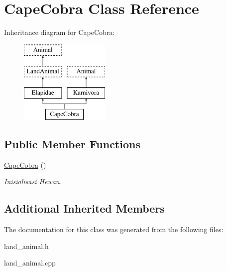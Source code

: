 \hypertarget{class_cape_cobra}{}\section{Cape\+Cobra Class Reference}
\label{class_cape_cobra}
Inheritance diagram for Cape\+Cobra\+:\begin{figure}[H]
\begin{center}
\leavevmode
\includegraphics[height=4.000000cm]{class_cape_cobra}
\end{center}
\end{figure}
\subsection*{Public Member Functions}
\begin{DoxyCompactItemize}
\item 
\hyperlink{class_cape_cobra_aa61f18faa72f114ac41641836bf07db7}{Cape\+Cobra} ()\hypertarget{class_cape_cobra_aa61f18faa72f114ac41641836bf07db7}{}\label{class_cape_cobra_aa61f18faa72f114ac41641836bf07db7}

\begin{DoxyCompactList}\small\item\em Inisialisasi Hewan. \end{DoxyCompactList}\end{DoxyCompactItemize}
\subsection*{Additional Inherited Members}


The documentation for this class was generated from the following files\+:\begin{DoxyCompactItemize}
\item 
land\+\_\+animal.\+h\item 
land\+\_\+animal.\+cpp\end{DoxyCompactItemize}
